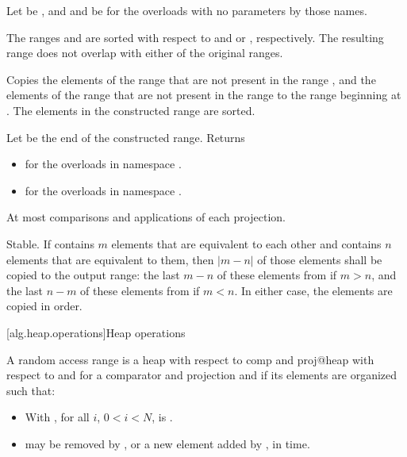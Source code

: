 \begin{itemdescr}
\pnum
Let  be ,
and  and  be 
for the overloads with no parameters by those names.

\pnum
\expects
The ranges  and  are sorted
with respect to  and  or , respectively.
The resulting range does not overlap with either of the original ranges.

\pnum
\effects
Copies the elements of the range 
that are not present in the range ,
and the elements of the range 
that are not present in the range 
to the range beginning at .
The elements in the constructed range are sorted.

\pnum
\returns
Let  be the end of the constructed range.
Returns
\begin{itemize}
\item
  for the overloads in namespace .
\item
  for the overloads in namespace .
\end{itemize}

\pnum
\complexity
At most 
comparisons and applications of each projection.

\pnum
\remarks
Stable.
If  contains $m$ elements
that are equivalent to each other and
 contains $n$ elements
that are equivalent to them,
then $|m - n|$ of those elements shall be copied to the output range:
the last $m - n$ of these elements from  if $m > n$, and
the last $n - m$ of these elements from  if $m < n$.
In either case, the elements are copied in order.
\end{itemdescr}

[alg.heap.operations]{Heap operations}

\pnum
A random access range  is a
{heap with respect to comp and proj@heap with respect to  and }
for a comparator and projection  and 
if its elements are organized such that:

\begin{itemize}
\item
  With , for all $i$, $0 < i < N$,
  is .
\item
   may be removed by , or
  a new element added by ,
  in  time.
\end{itemize}

